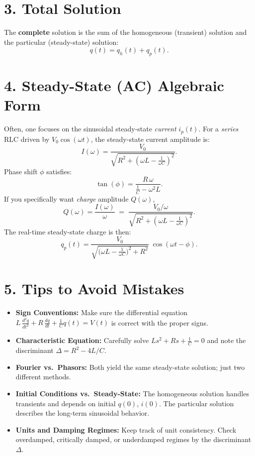 \documentclass[12pt]{article}
\begin{document}
\vspace{1em}
\section*{3. Total Solution}

\noindent The \textbf{complete} solution is the sum of the homogeneous (transient) solution and the particular (steady-state) solution:
\[
q(t) = q_h(t) + q_p(t).
\]

\vspace{1em}
\section*{4. Steady-State (AC) Algebraic Form}

\noindent Often, one focuses on the sinusoidal steady-state \textit{current} $i_p(t)$. For a \textit{series} RLC driven by $V_0 \cos(\omega t)$, the steady-state current amplitude is:
\[
I(\omega) = \frac{V_0}{\sqrt{R^2 + \left(\omega L - \frac{1}{\omega C}\right)^2}}.
\]
Phase shift $\phi$ satisfies:
\[
\tan(\phi) = \frac{R\,\omega}{\tfrac{1}{C} - \omega^2 L}.
\]
If you specifically want \textit{charge} amplitude $Q(\omega)$,
\[
Q(\omega) = \frac{I(\omega)}{\omega} \;=\; \frac{V_0 / \omega}{\sqrt{R^2 + \left(\omega L - \frac{1}{\omega C}\right)^2}}.
\]
The real-time steady-state charge is then:
\[
q_p(t) = \frac{V_0}{\sqrt{\Big(\omega L - \frac{1}{\omega C}\Big)^2 + R^2}}\;\cos(\omega t - \phi).
\]

\vspace{1em}
\section*{5. Tips to Avoid Mistakes}
\begin{itemize}
\item \textbf{Sign Conventions:} Make sure the differential equation $L\,\tfrac{d^2 q}{dt^2} + R\,\tfrac{d q}{dt} + \tfrac{1}{C} q(t) = V(t)$ is correct with the proper signs.
\item \textbf{Characteristic Equation:} Carefully solve $L s^2 + R s + \tfrac{1}{C} = 0$ and note the discriminant $\Delta = R^2 - 4L/C$.
\item \textbf{Fourier vs.\ Phasors:} Both yield the same steady-state solution; just two different methods.
\item \textbf{Initial Conditions vs.\ Steady-State:} The homogeneous solution handles transients and depends on initial $q(0)$, $i(0)$. The particular solution describes the long-term sinusoidal behavior.
\item \textbf{Units and Damping Regimes:} Keep track of unit consistency. Check overdamped, critically damped, or underdamped regimes by the discriminant $\Delta$.
\end{itemize}
\end{document}
